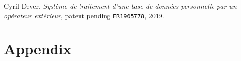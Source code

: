 \documentclass[twoside,twocolumn]{article}
\theoremstyle{definition}
\theoremstyle{remark}
\begin{document}


\begin{thebibliography}{99} %

Cyril Dever. \emph{Système de traitement d'une base de données personnelle par un opérateur extérieur}, patent pending \texttt{FR1905778}, 2019.

\end{thebibliography}


\onecolumn
\section*{Appendix}
\end{document}
